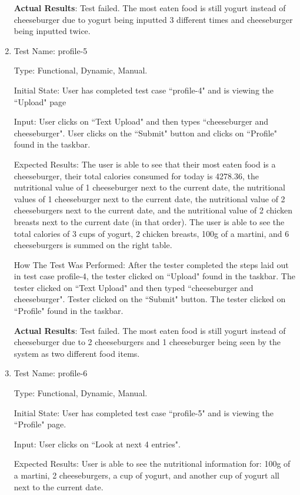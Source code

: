 \documentclass[12pt, titlepage]{article}
\begin{document}
\begin{enumerate}
		\textbf{Actual Results}: Test failed. The most eaten food is still yogurt instead of cheeseburger due to yogurt being inputted 3 different times and cheeseburger being inputted twice.
		
		\item{Test Name: profile-5}
		
		Type: Functional, Dynamic, Manual.
		
		Initial State: User has completed test case ``profile-4" and is viewing the ``Upload" page
		
		Input: User clicks on ``Text Upload" and then types ``cheeseburger and cheeseburger". User clicks on the ``Submit" button and clicks on ``Profile" found in the taskbar.
		
		Expected Results: The user is able to see that their most eaten food is a cheeseburger, their total calories consumed for today is 4278.36, the nutritional value of 1 cheeseburger next to the current date, the nutritional values of 1 cheeseburger next to the current date, the nutritional value of 2 cheeseburgers next to the current date, and the nutritional value of 2 chicken breasts next to the current date (in that order). The user is able to see the total calories of 3 cups of yogurt, 2 chicken breasts, 100g of a martini, and 6 cheeseburgers is summed on the right table.
		
		How The Test Was Performed: After the tester completed the steps laid out in test case profile-4, the tester clicked on ``Upload" found in the taskbar. The tester clicked on ``Text Upload" and then typed ``cheeseburger and cheeseburger". Tester clicked on the ``Submit" button. The tester clicked on ``Profile" found in the taskbar.
		
		\textbf{Actual Results}: Test failed. The most eaten food is still yogurt instead of cheeseburger due to 2 cheeseburgers and 1 cheeseburger being seen by the system as two different food items.
		
		\item{Test Name: profile-6}
		
		Type: Functional, Dynamic, Manual.
		
		Initial State: User has completed test case ``profile-5" and is viewing the ``Profile" page.
		
		Input: User clicks on ``Look at next 4 entries".
		
		Expected Results: User is able to see the nutritional information for: 100g of a martini, 2 cheeseburgers, a cup of yogurt, and another cup of yogurt all next to the current date.
		

\end{enumerate}
\end{document}
